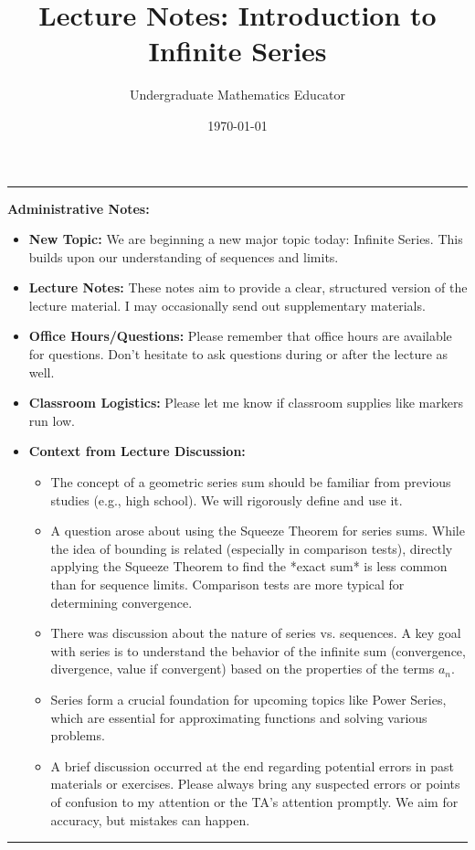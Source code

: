 \documentclass[11pt, letterpaper]{article}
\title{Lecture Notes: Introduction to Infinite Series}
\author{Undergraduate Mathematics Educator} %
\date{\today} %
\theoremstyle{plain} %
\theoremstyle{definition} %
\theoremstyle{remark} %
\newenvironment{adminnote}
  {\par\medskip\noindent\begin{center}\rule{\linewidth}{0.4pt}\end{center}\par\medskip\noindent\textbf{Administrative Notes:}\begin{itemize}}
  {\end{itemize}\par\medskip\noindent\begin{center}\rule{\linewidth}{0.4pt}\end{center}\par\medskip}
\begin{document}
\maketitle

\begin{adminnote}
    \item \textbf{New Topic:} We are beginning a new major topic today: Infinite Series. This builds upon our understanding of sequences and limits.
    \item \textbf{Lecture Notes:} These notes aim to provide a clear, structured version of the lecture material. I may occasionally send out supplementary materials.
    \item \textbf{Office Hours/Questions:} Please remember that office hours are available for questions. Don't hesitate to ask questions during or after the lecture as well.
    \item \textbf{Classroom Logistics:} Please let me know if classroom supplies like markers run low.
    \item \textbf{Context from Lecture Discussion:}
        \begin{itemize}
            \item The concept of a geometric series sum should be familiar from previous studies (e.g., high school). We will rigorously define and use it.
            \item A question arose about using the Squeeze Theorem for series sums. While the idea of bounding is related (especially in comparison tests), directly applying the Squeeze Theorem to find the *exact sum* is less common than for sequence limits. Comparison tests are more typical for determining convergence.
            \item There was discussion about the nature of series vs. sequences. A key goal with series is to understand the behavior of the infinite sum (convergence, divergence, value if convergent) based on the properties of the terms $a_n$.
            \item Series form a crucial foundation for upcoming topics like Power Series, which are essential for approximating functions and solving various problems.
            \item A brief discussion occurred at the end regarding potential errors in past materials or exercises. Please always bring any suspected errors or points of confusion to my attention or the TA's attention promptly. We aim for accuracy, but mistakes can happen.
        \end{itemize}
\end{adminnote}
\end{document}

